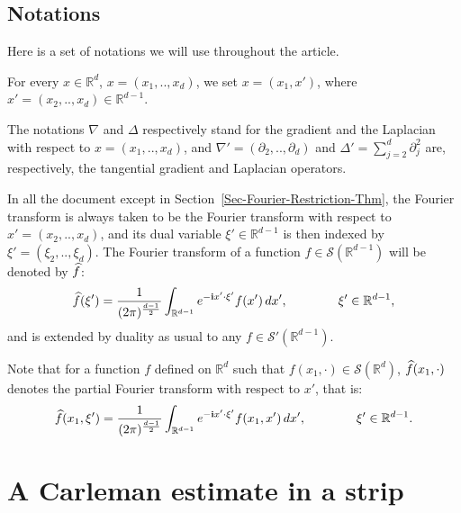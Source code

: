 \documentclass[AHL,Unicode,longabstracts]{cedram}
\newcommand{\scS}{\mathscr{S}}
\newcommand*\R{\mathbb{R}}
\renewcommand{\i}{\mathbf{i}}
\renewcommand{\hat}{\widehat}
\let\oldhat\hat
\renewcommand*{\hat}[1]{\mathchoice{\widehat{#1}}{\widehat{#1}}{\oldhat{#1}}{\oldhat{#1}}}
\begin{document}

\subsection*{Notations}

Here is a set of notations we will use throughout the article.

For every $x\in \R^{d}$, $x=(x_1,..,x_d)$, we set $x=(x_1,x')$, where $x'=(x_2,..,x_d) \in \R^{d-1}$.

The notations $\nabla$ and $\Delta$ respectively stand for the gradient and the Laplacian with respect to $x=(x_1,..,x_d)$, and $\nabla'=(\partial_{2},..,\partial_{{d}})$ and $\Delta'= \sum_{j=2}^{d} \partial_{j}^2$ are, respectively, the tangential gradient and Laplacian operators.

In all the document except in Section~\ref{Sec-Fourier-Restriction-Thm}, the Fourier transform is always taken to be the Fourier transform with respect to $x'=(x_2,..,x_d)$, and its dual variable $\xi' \in \R^{d-1}$ is then indexed by $\xi'=(\xi_2,..,\xi_d)$. The Fourier transform of a function $f \in \scS(\R^{d-1})$ will be denoted by $\hat f$:
\[
\hat f(\xi') = \frac{1}{(2\pi)^{\frac{d-1}{2}}} \int_{\R^{d-1}} e^{-\i x' \cdot \xi'} f(x') \, dx', \qquad \qquad\xi' \in \R^{d-1},
\]
and is extended by duality as usual to any $f \in \scS'(\R^{d-1})$.

Note that for a function $f$ defined on $\R^d$ such that $f(x_1,\cdot) \in \scS(\R^{d})$, $\hat f(x_1, \cdot)$ denotes the partial Fourier transform with respect to $x'$, that is:
\begin{equation}\label{Partial-Fourier-Transform}
\hat f(x_1,\xi') = \frac{1}{(2\pi)^{\frac{d-1}{2}}} \int_{\R^{d-1}} e^{-\i x' \cdot \xi'} f(x_1,x') \, dx', \qquad \qquad\xi' \in \R^{d-1}.
\end{equation}



\section{A Carleman estimate in a strip}\label{Sec-Carleman-Strip}
\end{document}
